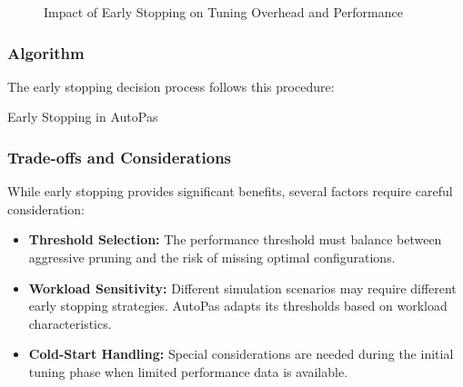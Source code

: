 \documentclass[conference]{IEEEtran}
\begin{document}
\begin{figure}[!t]
    \centering
    \caption{Impact of Early Stopping on Tuning Overhead and Performance}
    \label{fig_early_stopping}
\end{figure}

\subsubsection{Algorithm}
The early stopping decision process follows this procedure:


\begin{algorithm}[H]
    \caption{Early Stopping in AutoPas}
    \begin{algorithmic}[1]
        \Else
        \EndIf
        \EndFor
    \end{algorithmic}
\end{algorithm}

\subsubsection{Trade-offs and Considerations}
While early stopping provides significant benefits, several factors require careful consideration:

\begin{itemize}
    \item \textbf{Threshold Selection:} The performance threshold must balance between aggressive pruning and the risk of missing optimal configurations.

    \item \textbf{Workload Sensitivity:} Different simulation scenarios may require different early stopping strategies. AutoPas adapts its thresholds based on workload characteristics.

    \item \textbf{Cold-Start Handling:} Special considerations are needed during the initial tuning phase when limited performance data is available.
\end{itemize}
\end{document}
